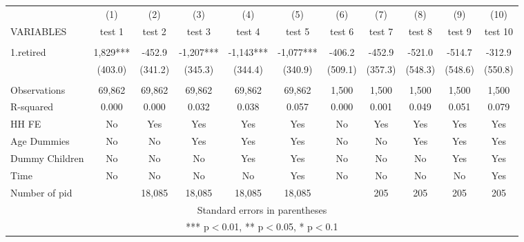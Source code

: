 \begin{tabular}{lcccccccccc} \hline
 & (1) & (2) & (3) & (4) & (5) & (6) & (7) & (8) & (9) & (10) \\
VARIABLES & test 1 & test 2 & test 3 & test 4 & test 5 & test 6 & test 7 & test 8 & test 9 & test 10 \\ \hline
 &  &  &  &  &  &  &  &  &  &  \\
1.retired & 1,829*** & -452.9 & -1,207*** & -1,143*** & -1,077*** & -406.2 & -452.9 & -521.0 & -514.7 & -312.9 \\
 & (403.0) & (341.2) & (345.3) & (344.4) & (340.9) & (509.1) & (357.3) & (548.3) & (548.6) & (550.8) \\
 &  &  &  &  &  &  &  &  &  &  \\
Observations & 69,862 & 69,862 & 69,862 & 69,862 & 69,862 & 1,500 & 1,500 & 1,500 & 1,500 & 1,500 \\
R-squared & 0.000 & 0.000 & 0.032 & 0.038 & 0.057 & 0.000 & 0.001 & 0.049 & 0.051 & 0.079 \\
HH FE & No & Yes & Yes & Yes & Yes & No & Yes & Yes & Yes & Yes \\
Age Dummies & No & No & Yes & Yes & Yes & No & No & Yes & Yes & Yes \\
Dummy Children & No & No & No & Yes & Yes & No & No & No & Yes & Yes \\
Time & No & No & No & No & Yes & No & No & No & No & Yes \\
 Number of pid &  & 18,085 & 18,085 & 18,085 & 18,085 &  & 205 & 205 & 205 & 205 \\ \hline
\multicolumn{11}{c}{ Standard errors in parentheses} \\
\multicolumn{11}{c}{ *** p$<$0.01, ** p$<$0.05, * p$<$0.1} \\
\end{tabular}
